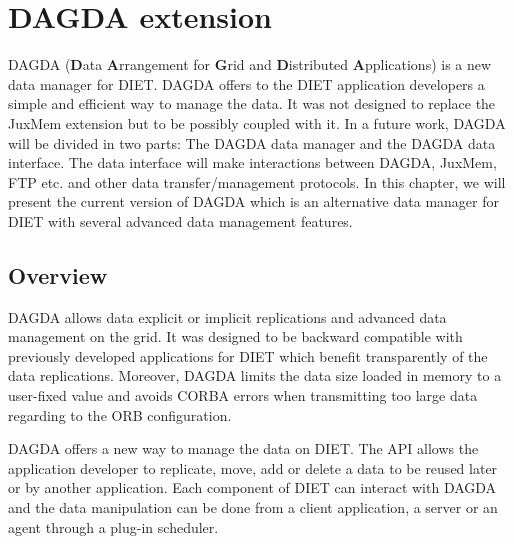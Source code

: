 \chapter{DAGDA extension}
\textsc{DAGDA} (\textbf{D}ata \textbf{A}rrangement for \textbf{G}rid and
\textbf{D}istributed \textbf{A}pplications) is a new data manager for DIET.
DAGDA offers  to the DIET application developers a simple and efficient way 
to manage the data. It was not designed to replace the JuxMem extension
but to be possibly coupled with it. In a future work, DAGDA will be
divided in two parts: The DAGDA data manager and the DAGDA data interface.
The data interface will make interactions between DAGDA, JuxMem, FTP
etc. and other data transfer/management protocols. In this chapter, we will
present the current version of DAGDA which is an alternative data manager
for DIET with several advanced data management features.
\section{Overview}
DAGDA allows data explicit or
implicit replications and advanced data management on the grid. It was
designed to be backward compatible with previously developed
applications for DIET which benefit transparently of the data
replications. Moreover, DAGDA limits the data size loaded in memory to
a user-fixed value and avoids CORBA errors when transmitting too large
data regarding to the ORB configuration.

DAGDA offers a new way to manage the data on DIET. The API allows the
application developer to replicate, move, add or delete a data to be
reused later or by another application. Each component of DIET can
interact with DAGDA and the data manipulation can be done from a
client application, a server or an agent through a plug-in
scheduler.

